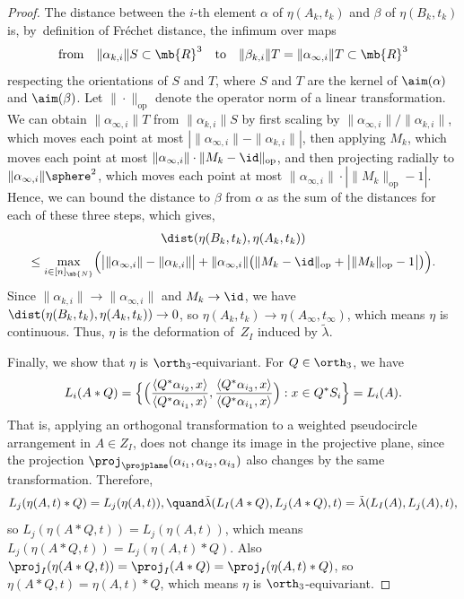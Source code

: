 \begin{proof}
The distance between the $i$-th element $\alpha$ of $\eta(A_k,t_k)$ and $\beta$ of $\eta(B_k,t_k)$ is, by~definition of Fréchet distance, the infimum over maps
\[
\text{from}\quad\|\alpha_{k,i}\|S \subset \mb{R}^3\quad\text{to}\quad\|\beta_{k,i}\|T = \|\alpha_{\infty,i}\|T \subset \mb{R}^3
\]
respecting the orientations of $S$ and $T$, where $S$ and $T$ are the kernel of $\aim(\alpha)$ and $\aim(\beta)$.
Let $\|\cdot\|_\text{op}$ denote the operator norm of a linear transformation.
We can obtain $\|\alpha_{\infty,i}\|T$ from $\|\alpha_{k,i}\|S$ by first scaling by $\|\alpha_{\infty,i}\|/\|\alpha_{k,i}\|$, which moves each point at most $\left| \| \alpha_{\infty,i} \| - \| \alpha_{k,i} \| \right|$, then applying $M_k$, which moves each point at most $\| \alpha_{\infty,i} \| \cdot \|M_k -\id \|_{\textrm{op}}$, and then projecting radially to $\|\alpha_{\infty,i}\| \sphere^2$, which moves each point at most $\| \alpha_{\infty,i} \| \cdot | \|M_k \|_{\textrm{op}} -1 |$. Hence, we can bound the distance to $\beta$ from $\alpha$ as the sum of the distances for each of these three steps, which gives,
\begin{multline*}
\dist(\eta(B_k,t_k), \eta(A_k,t_k))\\
\leq \max_{i \in [n]_\mb{N}} \Bigl( \bigl| \| \alpha_{\infty,i} \| - \| \alpha_{k,i} \| \bigr| +\| \alpha_{\infty,i} \| \bigl( \|M_k -\id \|_{\textrm{op}} +\bigl| \|M_k \|_{\textrm{op}} -1 \bigr| \bigr) \Bigr).
\end{multline*}
Since $\|\alpha_{k,i}\| \to \|\alpha_{\infty,i}\|$ and $M_k \to \id$, we have $\dist(\eta(B_k,t_k), \eta(A_k,t_k)) \to 0$, so
$\eta(A_k,t_k) \to \eta(A_\infty,t_\infty)$, which means $\eta$ is continuous.
Thus, $\eta$ is the deformation of~$Z_I$ induced by $\tilde \lambda$.

Finally, we show that $\eta$ is $\orth_3$-equivariant. For $Q \in \orth_3$, we have
\begin{align*}
L_i(A*Q)
= \Bigl\{ \Bigl( \frac{\langle Q^*\alpha_{i_2}, x \rangle}{\langle Q^*\alpha_{i_1}, x \rangle}, \frac{\langle Q^*\alpha_{i_3}, x \rangle}{\langle Q^*\alpha_{i_1}, x \rangle} \Bigr) :x \in Q^* S_i \Bigr\}
= L_i(A).
\end{align*}
That is, applying an orthogonal transformation to a weighted pseudocircle arrangement in $A \in Z_I$, does not change its image in the projective plane, since the projection $\proj_{\projplane}(\alpha_{i_1},\alpha_{i_2},\alpha_{i_3})$ also changes by the same transformation.
Therefore,
\[
L_j(\eta(A,t)*Q) = L_j(\eta(A,t)),\quand \tilde \lambda(L_I(A*Q),L_j(A*Q),t) = \tilde \lambda(L_I(A),L_j(A),t),
\]
so $L_j(\eta(A*Q,t)) = L_j(\eta(A,t))$, which means $L_j(\eta(A*Q,t)) = L_j(\eta(A,t)*Q)$.
Also $\proj_I(\eta(A*Q,t)) = \proj_I(A*Q) = \proj_I(\eta(A,t)*Q)$,
so $\eta(A*Q,t) = \eta(A,t)*Q$, which means $\eta$ is $\orth_3$-equivariant.
\end{proof}


